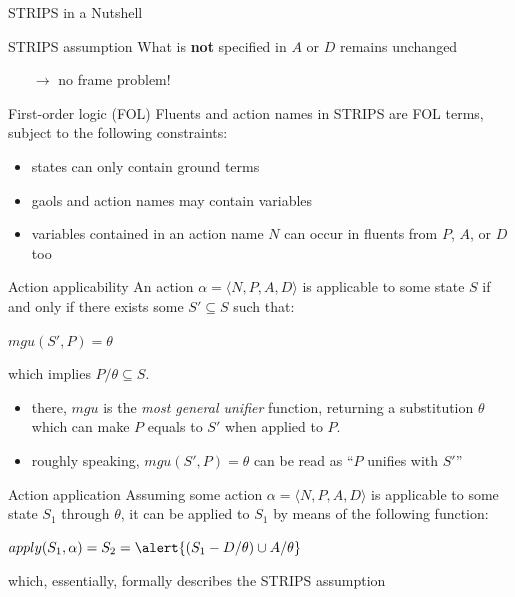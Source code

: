 \documentclass[presentation]{beamer}\mode<presentation>{\usetheme{AMSBolognaFC}}
\begin{document}
\begin{frame}[allowframebreaks]{STRIPS in a Nutshell}
\begin{alertblock}{STRIPS assumption}
    What is \textbf{not} specified in $A$ or $D$ remains unchanged
    \begin{itemize}
        \item[$\rightarrow$] no frame problem!
    \end{itemize}
\end{alertblock}

\begin{block}{First-order logic (FOL)}
    Fluents and action names in STRIPS are FOL \alert{terms}, subject to the following constraints:
    \begin{itemize}
        \item states can only contain \alert{ground} terms
        \item gaols and action names may contain \alert{variables}
        \item variables contained in an action name $N$ can occur in fluents from $P$, $A$, or $D$ too
    \end{itemize}
\end{block}

\framebreak

\begin{block}{Action applicability}
    An action $\alpha = \langle N, P, A, D \rangle$ is \alert{applicable} to some state $S$ if and only if there exists some $S' \subseteq S$ such that:
    \begin{center}
        $mgu(S', P) = \theta$
    \end{center}
    which implies $P / \theta \subseteq S$.
\end{block}
%
\begin{itemize}
    \item there, $mgu$ is the \emph{most general unifier} function, returning a substitution $\theta$ which can make $P$ equals to $S'$ when applied to $P$.
    \item roughly speaking, $mgu(S', P) = \theta$ can be read as ``$P$ unifies with $S'$''
\end{itemize}

\begin{block}{Action application}
    Assuming some action $\alpha = \langle N, P, A, D \rangle$ is applicable to some state $S_1$ through $\theta$, it can be applied to $S_1$ by means of the following function:
    \begin{center}
         $apply(S_1, \alpha) = S_2 = \alert{(S_1 - D / \theta) \cup A / \theta} $
    \end{center}
    which, essentially, formally describes the STRIPS assumption
\end{block}

\end{frame}
\end{document}
